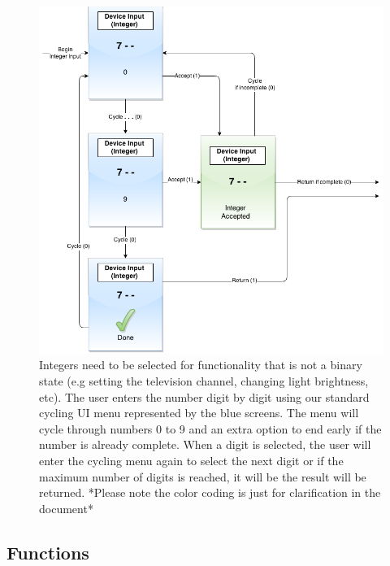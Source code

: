 \documentclass{article}
\begin{document}
\begin{figure}
	\includegraphics[width=\textwidth]{IntegerInput_srs_final.png}
	
	\caption{Integers need to be selected for functionality that is not a binary state (e.g setting the television channel, changing light brightness, etc). The user enters the number digit by digit using our standard cycling UI menu represented by the blue screens. The menu will cycle through numbers 0 to 9 and an extra option to end early if the number is already complete. When a digit is selected, the user will enter the cycling menu again to select the next digit or if the maximum number of digits is reached, it will be the result will be returned. *Please note the color coding is just for clarification in the document*}
	\label{fig:integer}
\end{figure}



\subsection{Functions}

\end{document}
